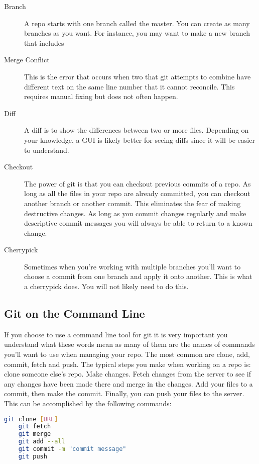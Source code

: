 \begin{description}
	\item[Branch] A repo starts with one branch called the master. You can create as many branches as you want. For instance, you may want to make a new branch that includes 
	\item[Merge Conflict] This is the error that occurs when two that git attempts to combine have different text on the same line number that it cannot reconcile. This requires manual fixing but does not often happen.
	\item[Diff] A diff is to show the differences between two or more files. Depending on your knowledge, a GUI is likely better for seeing diffs since it will be easier to understand.
	\item[Checkout] The power of git is that you can checkout previous commits of a repo. As long as all the files in your repo are already committed, you can checkout another branch or another commit. This eliminates the fear of making destructive changes. As long as you commit changes regularly and make descriptive commit messages you will always be able to return to a known change.
	\item[Cherrypick] Sometimes when you're working with multiple branches you'll want to choose a commit from one branch and apply it onto another. This is what a cherrypick does. You will not likely need to do this.
\end{description}

\subsection{Git on the Command Line}

If you choose to use a command line tool for git it is very important you understand what these words mean as many of them are the names of commands you'll want to use when managing your repo. The most common are clone, add, commit, fetch and push. The typical steps you make when working on a repo is: clone someone else's repo. Make changes. Fetch changes from the server to see if any changes have been made there and merge in the changes. Add your files to a commit, then make the commit. Finally, you can push your files to the server. This can be accomplished by the following commands:

\begin{lstlisting}[language=bash]
	git clone [URL]
	git fetch
	git merge
	git add --all
	git commit -m "commit message"
	git push
\end{lstlisting}

